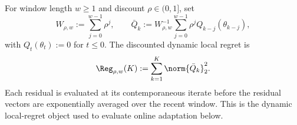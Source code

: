 For window length $w\ge1$ and discount $\rho\in(0,1]$, set
\begin{equation}\label{eq:dynamic-window-residual}
 W_{\rho,w}:=\sum_{j=0}^{w-1}\rho^j,
 \qquad
 \bar Q_k:=W_{\rho,w}^{-1}\sum_{j=0}^{w-1}\rho^j Q_{k-j}(\theta_{k-j}),
\end{equation}
with $Q_t(\theta_t):=0$ for $t\le0$.  The discounted dynamic local regret is
\begin{equation}\label{eq:dynamic-regret}
 \Reg_{\rho,w}(K):=\sum_{k=1}^{K}\norm{\bar Q_k}_2^2.
\end{equation}
Each residual is evaluated at its contemporaneous iterate before the residual vectors are exponentially averaged over the recent window.  This is the dynamic local-regret object used to evaluate online adaptation below.
